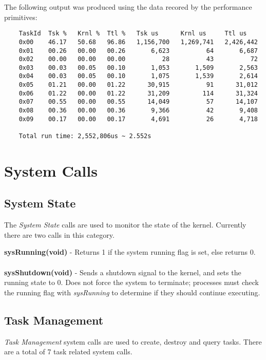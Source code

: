 \documentclass[twoside,a4paper]{refart}
\begin{document}
The following output was produced using the data recored by the performance primitives:
\begin{verbatim}
    TaskId  Tsk %   Krnl %  Ttl %   Tsk us      Krnl us     Ttl us
    0x00    46.17   50.68   96.86   1,156,700   1,269,741   2,426,442
    0x01    00.26   00.00   00.26       6,623          64       6,687
    0x02    00.00   00.00   00.00          28          43          72
    0x03    00.03   00.05   00.10       1,053       1,509       2,563
    0x04    00.03   00.05   00.10       1,075       1,539       2,614
    0x05    01.21   00.00   01.22      30,915          91      31,012
    0x06    01.22   00.00   01.22      31,209         114      31,324
    0x07    00.55   00.00   00.55      14,049          57      14,107
    0x08    00.36   00.00   00.36       9,366          42       9,408
    0x09    00.17   00.00   00.17       4,691          26       4,718

    Total run time: 2,552,806us ~ 2.552s
\end{verbatim}

\section{System Calls}
\subsection{System State}

The \textit{System State} calls are used to monitor the state of the kernel. Currently there are two calls in this category.

\textbf{sysRunning(void)} - Returns 1 if the system running flag is set, else returns 0.\\\\
\textbf{sysShutdown(void)} - Sends a shutdown signal to the kernel, and sets the running state to 0. Does not force the system to terminate; processes must check the running flag with \textit{sysRunning} to determine if they should continue executing.

\subsection{Task Management}

\textit{Task Management} system calls are used to create, destroy and query tasks. There are a total of 7 task related system calls.
\end{document}
